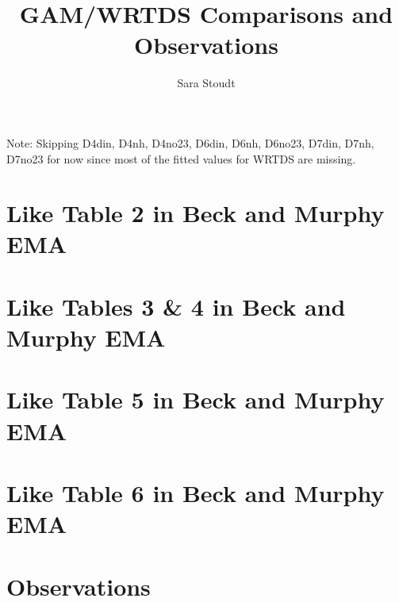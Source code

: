 \documentclass[12pt]{amsart}
\title{GAM/WRTDS Comparisons and Observations}
\author{Sara Stoudt}
\begin{document}
\maketitle

Note: Skipping D4din, D4nh, D4no23, D6din, D6nh, D6no23, D7din, D7nh, D7no23 for now since most of the fitted values for WRTDS are missing.

\section{Like Table 2 in Beck and Murphy EMA}





\section{Like Tables 3 \& 4 in Beck and Murphy EMA}




\section{Like Table 5 in Beck and Murphy EMA}




\section{Like Table 6 in Beck and Murphy EMA}




\section{Observations}
\end{document}
